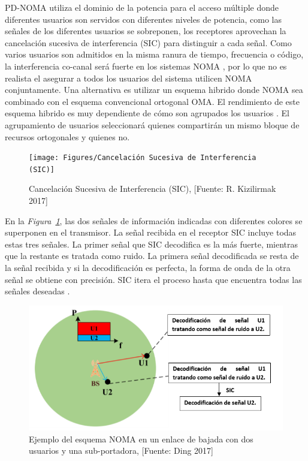 PD-NOMA utiliza el dominio de la potencia para el acceso múltiple donde diferentes usuarios son servidos con diferentes niveles de potencia, como las señales de los diferentes usuarios se sobreponen, los receptores aprovechan la cancelación sucesiva de interferencia (SIC) para distinguir a cada señal. Como varios usuarios son admitidos en la misma ranura de tiempo, frecuencia o código, la interferencia co-canal será fuerte en los sistemas NOMA \parencite{Ding2016}, por lo que no es realista el asegurar a todos los usuarios del sistema utilicen NOMA conjuntamente. Una alternativa es utilizar un esquema hibrido donde NOMA sea combinado con el esquema convencional ortogonal OMA. El rendimiento de este esquema hibrido es muy dependiente de cómo son agrupados los usuarios \parencite{Ding2016}. El agrupamiento de usuarios seleccionará quienes compartirán un mismo bloque de recursos ortogonales y quienes no.\newline

\begin{figure}[th]
\centering
\texttt{[image: Figures/Cancelación Sucesiva de Interferencia (SIC)]}
\decoRule
\caption[Cancelación Sucesiva de Interferencia (SIC)]{Cancelación Sucesiva de Interferencia (SIC), [Fuente: R. Kizilirmak 2017]}
\label{fig:SIC}
\end{figure}

En la \textit{Figura~\ref{fig:SIC}}, las dos señales de información indicadas con diferentes colores se superponen en el transmisor. La señal recibida en el receptor SIC incluye todas estas tres señales. La primer señal que SIC decodifica es la más fuerte, mientras que la restante es tratada como ruido. La primera señal decodificada se resta de la señal recibida y si la decodificación es perfecta, la forma de onda de la otra señal se obtiene con precisión. SIC itera el proceso hasta que encuentra todas las señales deseadas \parencite{Kizilirmak2016}.\newline

\begin{figure}[th]
\centering
\includegraphics[scale=.85]{Figures/Ejemplo del esquema NOMA en un enlace de bajada con dos usuarios y una sub-portadora}
\decoRule
\caption[Ejemplo del esquema NOMA en un enlace de bajada con dos usuarios y una sub-portadora.]{Ejemplo del esquema NOMA en un enlace de bajada con dos usuarios y una sub-portadora, [Fuente: Ding 2017]}
\label{fig:NOMADL}
\end{figure}

